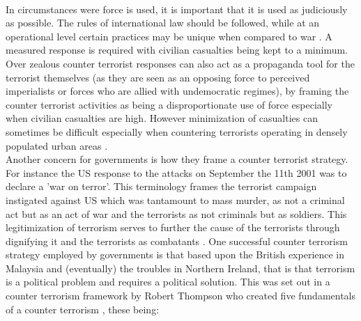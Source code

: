 \\
In circumstances were force is used, it is important that it is used as judiciously as possible. The rules of international law should be followed, while at an operational level certain practices may be unique when compared to war \citep{roberts2002counter}. A measured response is required with civilian casualties being kept to a minimum. Over zealous counter terrorist responses can also act as a propaganda tool for the terrorist themselves (as they are seen as an opposing force to perceived imperialists or forces who are allied with undemocratic regimes), by framing the counter terrorist activities as being a disproportionate use of force especially when civilian casualties are high. However minimization of casualties can sometimes be difficult especially when countering terrorists operating in densely populated urban areas \citep{graham2009urban}.  
\\
Another concern for governments is how they frame a counter terrorist strategy. For instance the US response to the attacks on September the 11th 2001 was to declare a 'war on terror'. This terminology frames the terrorist campaign instigated against US which was tantamount to mass murder, as not a criminal act but as an act of war and the terrorists as not criminals but as soldiers. This legitimization of terrorism serves to further the cause of the terrorists through dignifying it and the terrorists as combatants \citep{moeller2009packaging}. One successful counter terrorism  strategy employed by governments is that based upon the British experience in Malaysia and (eventually) the troubles in Northern Ireland, that is that terrorism is a political problem and requires a political solution. This was set out in a counter terrorism framework by Robert Thompson \citep{hamilton1998art} who created five fundamentals of a counter terrorism \citep{thompson1966defeating}, these being:
